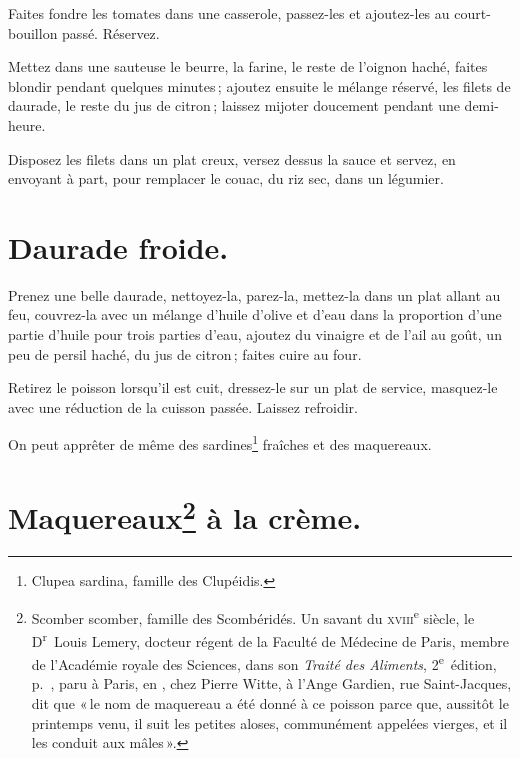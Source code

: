 Faites fondre les tomates dans une casserole, passez-les et ajoutez-les au
court-bouillon passé. Réservez.

Mettez dans une sauteuse le beurre, la farine, le reste de l'oignon haché,
faites blondir pendant quelques minutes ; ajoutez ensuite le mélange réservé,
les filets de daurade, le reste du jus de citron ; laissez mijoter doucement
pendant une demi-heure.

Disposez les filets dans un plat creux, versez dessus la sauce et servez, en
envoyant à part, pour remplacer le couac, du riz sec, dans un légumier.

\section*{\centering Daurade froide.}

Prenez une belle daurade, nettoyez-la, parez-la, mettez-la dans un plat allant
au feu, couvrez-la avec un mélange d'huile d'olive et d'eau dans la proportion
d'une partie d'huile pour trois parties d'eau, ajoutez du vinaigre et de l'ail
au goût, un peu de persil haché, du jus de citron ; faites cuire au four.

Retirez le poisson lorsqu'il est cuit, dressez-le sur un plat de service,
masquez-le avec une réduction de la cuisson passée. Laissez refroidir.

\sk

On peut apprêter de même des sardines\footnote{Clupea sardina, famille des
Clupéidis.} fraîches et des maquereaux.

\section*{\centering Maquereaux\footnote{Scomber scomber, famille des
Scombéridés. Un savant du \textsc{xviii}\textsuperscript{e} siècle, le
D\textsuperscript{r} Louis Lemery, docteur régent de la Faculté de Médecine de
Paris, membre de l'Académie royale des Sciences, dans son \textit{Traité des
Aliments}, 2\textsuperscript{e} édition, p. {\mmm}, paru à Paris, en
{\mmm}, chez Pierre Witte, à l'Ange Gardien, rue Saint-Jacques, dit que
« le nom de maquereau a été donné à ce poisson parce que, aussitôt le printemps
venu, il suit les petites aloses, communément appelées vierges, et il les
conduit aux mâles ».} à la crème.}


